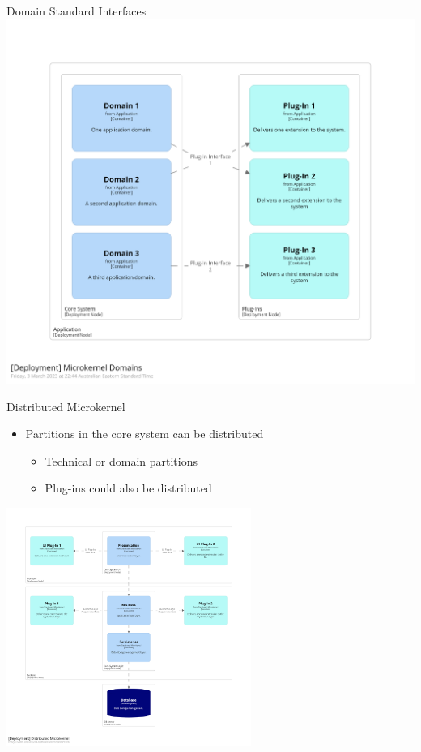 \documentclass{slide}
\begin{document}
\begin{frame}{Domain Standard Interfaces}
    \vspace{3mm}
    \centering
    \includegraphics[trim=197 197 197 195,clip,width=1\textheight]{../../notes/microkernel/diagrams/domain-microkernel.png}
\end{frame}

\begin{frame}{Distributed Microkernel}
    \begin{itemize}
        \Large\item Partitions in the core system can be distributed
        \begin{itemize}
            \large\item Technical or domain partitions
            \large\item Plug-ins could also be distributed
        \end{itemize}
    \end{itemize}
    \vspace{3mm}
    \centering
    \includegraphics[trim=195 197 195 195,clip,width=0.6\textwidth]{../../notes/microkernel/diagrams/separate-ui-microkernel.png}
\end{frame}
\end{document}
